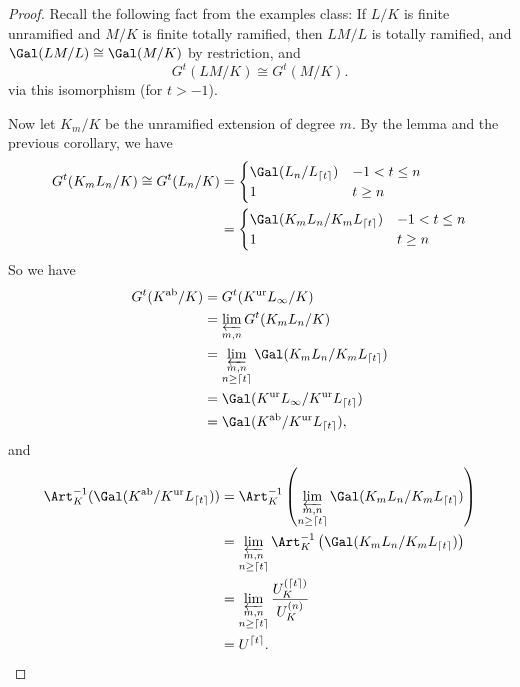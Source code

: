 \documentclass[a4paper]{article}
\begin{document}
\begin{proof}
  Recall the following fact from the examples class: If $L/K$ is finite unramified and $M/K$ is finite totally ramified, then $LM/L$ is totally ramified, and $\Gal(LM/L) \cong \Gal(M/K)$ by restriction, and %
  \[
    G^t(LM/K) \cong G^t(M/K).
  \]
  via this isomorphism (for $t > -1$).

  Now let $K_m/K$ be the unramified extension of degree $m$. By the lemma and the previous corollary, we have
  \begin{align*}
    G^t(K_m L_n/K) \cong G^t(L_n/K) &=
    \begin{cases}
      \Gal(L_n/L_{\lceil t\rceil}) & -1 < t \leq n\\
      1 & t \geq n
    \end{cases}\\
    &=
    \begin{cases}
      \Gal(K_m L_n / K_m L_{\lceil t\rceil}) & -1 < t \leq n\\
      1 & t \geq n
    \end{cases}
  \end{align*}
  So we have
  \begin{align*}
    G^t(K^{\mathrm{ab}}/K) &= G^t(K^{\mathrm{ur}} L_\infty/K) \\
    &= \varprojlim_{m, n} G^t(K_m L_n/K) \\
    &= \varprojlim_{\substack{m, n\\n \geq \lceil t\rceil}} \Gal(K_m L_n/K_m L_{\lceil t\rceil})\\
    &= \Gal(K^{\mathrm{ur}}L_\infty/K^{\mathrm{ur}}L_{\lceil t\rceil})\\
    &= \Gal(K^{\mathrm{ab}} / K^{\mathrm{ur}}L_{\lceil t\rceil}),
  \end{align*}
  and
  \begin{align*}
    \Art_K^{-1}(\Gal(K^{\mathrm{ab}}/K^{\mathrm{ur}} L_{\lceil t \rceil})) &= \Art_K^{-1} \left(\varprojlim_{\substack{m, n\\n \geq \lceil t\rceil}} \Gal(K_m L_n/K_m L_{\lceil t\rceil})\right)\\
    &= \varprojlim_{\substack{m, n\\n \geq \lceil t\rceil}} \Art_K^{-1} \left(\Gal(K_m L_n/K_m L_{\lceil t\rceil})\right)\\
    &= \varprojlim_{\substack{m, n\\n \geq \lceil t\rceil}} \frac{U_K^{(\lceil t\rceil)}}{U_K^{(n)}}\\
    &= U^{\lceil t \rceil}.
  \end{align*}
\end{proof}
\end{document}
